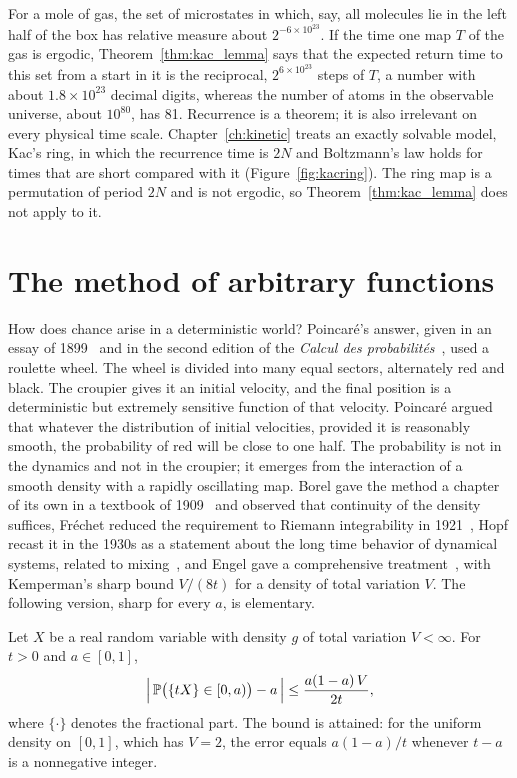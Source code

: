 For a mole of gas, the set of microstates in which, say, all molecules lie in the left half of the box has relative measure about $2^{-6\times 10^{23}}$. If the time one map $T$ of the gas is ergodic, Theorem~\ref{thm:kac_lemma} says that the expected return time to this set from a start in it is the reciprocal, $2^{6\times10^{23}}$ steps of $T$, a number with about $1.8\times10^{23}$ decimal digits, whereas the number of atoms in the observable universe, about $10^{80}$, has 81. Recurrence is a theorem; it is also irrelevant on every physical time scale. Chapter~\ref{ch:kinetic} treats an exactly solvable model, Kac's ring, in which the recurrence time is $2N$ and Boltzmann's law holds for times that are short compared with it (Figure~\ref{fig:kacring}). The ring map is a permutation of period $2N$ and is not ergodic, so Theorem~\ref{thm:kac_lemma} does not apply to it.

\section{The method of arbitrary functions}

How does chance arise in a deterministic world? Poincar\'e's answer, given in an essay of 1899~\cite{poincare1899} and in the second edition of the \emph{Calcul des probabilit\'es}~\cite{poincare1912calcul}, used a roulette wheel. The wheel is divided into many equal sectors, alternately red and black. The croupier gives it an initial velocity, and the final position is a deterministic but extremely sensitive function of that velocity. Poincar\'e argued that whatever the distribution of initial velocities, provided it is reasonably smooth, the probability of red will be close to one half. The probability is not in the dynamics and not in the croupier; it emerges from the interaction of a smooth density with a rapidly oscillating map. Borel gave the method a chapter of its own in a textbook of 1909~\cite{borel1909elements} and observed that continuity of the density suffices, Fr\'echet reduced the requirement to Riemann integrability in 1921~\cite{frechet1921}, Hopf recast it in the 1930s as a statement about the long time behavior of dynamical systems, related to mixing~\cite{hopf1934}, and Engel gave a comprehensive treatment~\cite{engel1992}, with Kemperman's sharp bound $V/(8t)$ for a density of total variation $V$. The following version, sharp for every $a$, is elementary.

\begin{theorem}
\label{thm:arbitrary}
Let $X$ be a real random variable with density $g$ of total variation $V<\infty$. For $t>0$ and $a\in[0,1]$,
\[
\Big|\,\P\big(\{tX\}\in[0,a)\big) - a\,\Big|\leq \frac{a(1-a)\,V}{2t},
\]
where $\{\cdot\}$ denotes the fractional part. The bound is attained: for the uniform density on $[0,1]$, which has $V=2$, the error equals $a(1-a)/t$ whenever $t-a$ is a nonnegative integer.
\end{theorem}

